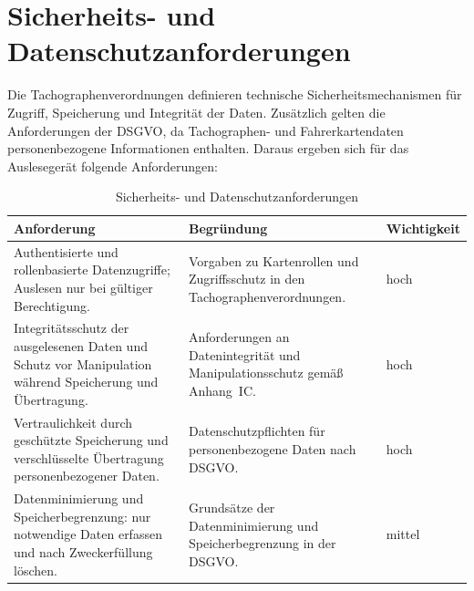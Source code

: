 \newpage
\section{Sicherheits- und Datenschutzanforderungen}
Die Tachographenverordnungen definieren technische Sicherheitsmechanismen für Zugriff, Speicherung und Integrität der Daten. Zusätzlich gelten die Anforderungen der DSGVO, da Tachographen- und Fahrerkartendaten personenbezogene Informationen enthalten.
Daraus ergeben sich für das Auslesegerät folgende Anforderungen:
\begin{table}[H]
  \centering
  \begin{tabularx}{\textwidth}{|>{\raggedright\arraybackslash}p{}|>{\raggedright\arraybackslash}X|>{\raggedright\arraybackslash}p{}|}
    \hline
    \textbf{Anforderung} & \textbf{Begründung} & \textbf{Wichtigkeit} \\
    \hline
    Authentisierte und rollenbasierte Datenzugriffe; Auslesen nur bei gültiger Berechtigung. & Vorgaben zu Kartenrollen und Zugriffsschutz in den Tachographenverordnungen.\cite{eu-2016-799,eu-2021-1228} & hoch \\
    \hline
    Integritätsschutz der ausgelesenen Daten und Schutz vor Manipulation während Speicherung und Übertragung. & Anforderungen an Datenintegrität und Manipulationsschutz gemäß Anhang~IC.\cite{eu-2016-799,eu-2021-1228} & hoch \\
    \hline
    Vertraulichkeit durch geschützte Speicherung und verschlüsselte Übertragung personenbezogener Daten. & Datenschutzpflichten für personenbezogene Daten nach DSGVO.\cite{eu-gdpr-2016-679} & hoch \\
    \hline
    Datenminimierung und Speicherbegrenzung: nur notwendige Daten erfassen und nach Zweckerfüllung löschen. & Grundsätze der Datenminimierung und Speicherbegrenzung in der DSGVO.\cite{eu-gdpr-2016-679} & mittel \\
    \hline
  \end{tabularx}
  \vspace{0.3\baselineskip}
  \caption{Sicherheits- und Datenschutzanforderungen}
  \label{tab:sicherheits-datenschutz-anforderungen}
\end{table}
